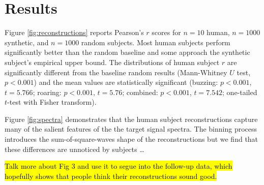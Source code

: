 \documentclass[journal]{IEEEtran}
\begin{document}


\section{Results}


Figure \ref{fig:reconstructions} reports Pearson's $r$ scores
for $n=10$ human, $n=1000$ synthetic, and $n=1000$ random subjects.
Most human subjects perform significantly better than the random baseline
and some approach the synthetic subject's empirical upper bound.
The distributions of human subject $r$ are significantly different
from the baseline random results (Mann-Whitney $U$ test, $p < 0.001$)
and the mean values are statistically significant
(buzzing: $p < 0.001$, $t = 5.766$; roaring: $p < 0.001$, $t = 5.76$;
combined: $p < 0.001$, $t = 7.542$; one-tailed $t$-test with Fisher transform).

Figure \ref{fig:spectra} demonstrates that the human subject reconstructions
capture many of the salient features of the the target signal spectra.
The binning process introduces the sum-of-square-waves shape of the reconstructions
but we find that these differences are unnoticed by subjects \dots

\hl{Talk more about Fig 3 and use it to segue into the follow-up data,
which hopefully shows that people think their reconstructions sound good.}
\end{document}
